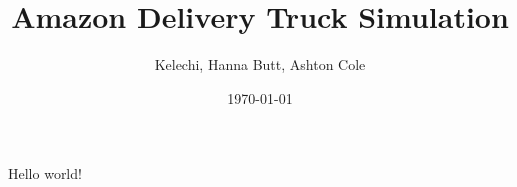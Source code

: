 \documentclass{article}
\title{Amazon Delivery Truck Simulation}
\author{Kelechi, Hanna Butt, Ashton Cole}
\date{\today}
\begin{document}
    \maketitle
    Hello world!
\end{document}
